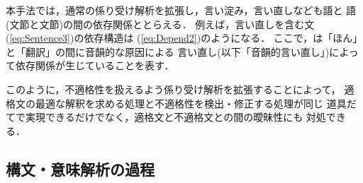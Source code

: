 本手法では，通常の係り受け解析を拡張し，言い淀み，言い直しなども語と
語(文節と文節)の間の依存関係ととらえる．
例えば，言い直しを含む文(\ref{eq:Sentence3})の依存構造は
(\ref{eq:Depend2})のようになる．
ここで，は「ほん」と「翻訳」の間に音韻的な原因による
言い直し(以下「音韻的言い直し」)によって依存関係が生じていることを表す．

このように，不適格性を扱えるよう係り受け解析を拡張することによって，
適格文の最適な解釈を求める処理と不適格性を検出・修正する処理が同じ
道具だてで実現できるだけでなく，適格文と不適格文との間の曖昧性にも
対処できる．

\subsection{構文・意味解析の過程}\label{sec:Uniform:Process}

